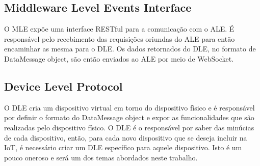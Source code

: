 \subsection{Middleware Level Events Interface}
O MLE expõe uma interface RESTful para a comunicação com o ALE. É responsável pelo recebimento das requisições
oriundas do ALE para então encaminhar as mesma para o DLE. Os dados retornados do DLE, no formato de DataMessage
object, são então enviados ao ALE por meio de WebSocket.

\subsection{Device Level Protocol}
O DLE cria um dispositivo virtual em torno do dispositivo físico e é responsável por definir o formato do DataMessage
object e expor as funcionalidades que são realizadas pelo dispositivo físico. O DLE é o responsável por saber das
minúcias de cada dispositivo, então, para cada novo dispositivo que se deseja incluir na IoT, é necessário criar
um DLE específico para aquele dispositivo. Isto é um pouco oneroso e será um dos temas abordados neste trabalho.
